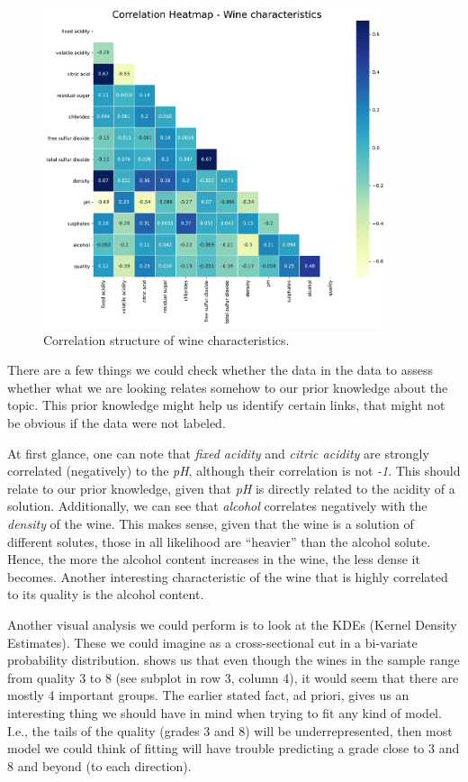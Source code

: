 \documentclass[11pt]{article}
\begin{document}
\begin{figure}[h!]
    \includegraphics[width=0.9\textwidth]{figs/wine_heatmap}
    \caption{Correlation structure of wine characteristics.}
    \label{fig:wine_heatmap}
\end{figure}


There are a few things we could check whether the data in the data to assess whether what we are looking relates somehow
to our prior knowledge about the topic.
This prior knowledge might help us identify certain links, that might not be obvious if the data were not labeled.

At first glance, one can note that \emph{fixed acidity} and \emph{citric acidity} are strongly correlated (negatively) to the \emph{pH},
although their correlation is not \emph{-1}.
This should relate to our prior knowledge, given that \emph{pH} is directly related to the acidity of a
solution.
Additionally, we can see that \emph{alcohol} correlates negatively with the \emph{density} of the wine.
This makes sense, given that the wine is a solution of different solutes, those in all likelihood are ``heavier''
than the alcohol solute.
Hence, the more the alcohol content increases in the wine, the less dense it becomes.
Another interesting characteristic of the wine that is highly correlated to its quality is the
alcohol content.

\vspace{2pt}
Another visual analysis we could perform is to look at the KDEs (Kernel Density Estimates).
These we could imagine as a cross-sectional cut in a bi-variate probability distribution.
 shows us that even though the wines in the sample range from quality 3 to 8
(see subplot in row 3, column 4), it would seem that there are mostly 4 important groups.
The earlier stated fact, ad priori, gives us an interesting thing we should have in mind when trying
to fit any kind of model.
I.e., the tails of the quality (grades 3 and 8) will be underrepresented, then most model we could think
of fitting will have trouble predicting a grade close to 3 and 8 and beyond (to each direction).
\end{document}
